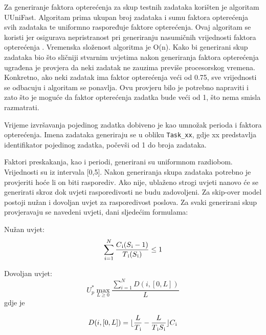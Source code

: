 \documentclass[../zavrsni.tex]{subfiles}
\begin{document}
Za generiranje faktora opterećenja za skup testnih zadataka korišten je algoritam UUniFast. Algoritam prima ukupan broj zadataka 
i sumu faktora opterećenja svih zadataka te uniformno raspoređuje faktore opterećenja. 
Ovaj algoritam se koristi jer osigurava nepristranost pri generiranju nasumičnih vrijednosti faktora opterećenja \cite{clanak_5}.
Vremenska složenost algoritma je O(n). Kako bi generirani skup zadataka bio što sličniji stvarnim uvjetima
nakon generiranja faktora opterećenja ugrađena je provjera da neki zadatak ne zauzima previše procesorskog vremena. Konkretno, ako neki zadatak ima faktor
opterećenja veći od 0.75, sve vrijednosti se odbacuju i algoritam se ponavlja. Ovu provjeru bilo je potrebno napraviti i zato što je moguće da faktor
opterećenja zadatka bude veći od 1, što nema smisla razmatrati.

Vrijeme izvršavanja pojedinog zadatka dobiveno je kao umnožak perioda i faktora opterećenja.
Imena zadataka generiraju se u obliku \texttt{Task\_xx}, gdje xx predstavlja identifikator pojedinog zadatka, počevši od 1 do broja zadataka.

Faktori preskakanja, kao i periodi, generirani su uniformnom razdiobom. Vrijednosti su iz intervala [0,5].
Nakon generiranja skupa zadataka potrebno je provjeriti hoće li on biti rasporediv. Ako nije, ublaženo strogi uvjeti nanovo 
će se generirati skroz dok uvjeti rasporedivosti ne budu zadovoljeni. Za skip-over model postoji nužan i dovoljan uvjet za rasporedivost 
poslova. Za svaki generirani skup provjeravaju se navedeni uvjeti, dani sljedećim formulama: 

Nužan uvjet:
\begin{equation*}
    \sum_{i=1}^{N}\frac{C\textsubscript{i}(S\textsubscript{i}-1)}{T\textsubscript{i}(S\textsubscript{i})} \le 1
\end{equation*}

Dovoljan uvjet:
\begin{equation*}
    U_{p}^{*} \max_{L\geq0}\frac{\sum_{i=1}^{N}D(i,[0,L])}{L}
\end{equation*}
gdje je 

\begin{equation*}
    D(i,[0,L])=\lfloor \frac{L}{T\textsubscript{i}}-\frac{L}{T\textsubscript{i}S\textsubscript{i}} \rfloor C\textsubscript{i}
\end{equation*}
\end{document}
